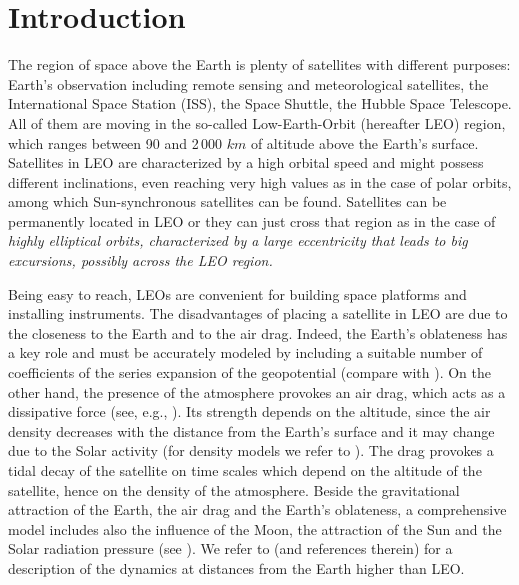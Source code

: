 \documentclass[12pt,reqno]{amsart}
\numberwithin{equation}{section}
\begin{document}

\maketitle



\section{Introduction}\label{sec:intro}
The region of space above the Earth is plenty of satellites with
different purposes: Earth's observation including remote sensing
and meteorological satellites, the International Space Station
(ISS), the Space Shuttle, the Hubble Space Telescope. All of them
are moving in the so-called Low-Earth-Orbit (hereafter LEO)
region, which ranges between 90 and 2\,000 $km$ of altitude above
the Earth's surface. Satellites in LEO are characterized by a high
orbital speed and might possess different inclinations, even
reaching very high values as in the case of polar orbits, among
which Sun-synchronous satellites can be found. Satellites can be
permanently located in LEO or they can just cross that region as in
the case of \sl highly elliptical orbits, \rm characterized by a
large eccentricity that leads to big excursions, possibly across
the LEO region.

Being easy to reach, LEOs are convenient for building space
platforms and installing instruments. The disadvantages of placing
a satellite in LEO are due to the closeness to the Earth and to
the air drag. Indeed, the Earth's oblateness has a key role and
must be accurately modeled by including a suitable number of
coefficients of the series expansion of the geopotential (compare
with \cite{FV,Liu}). On the other hand, the presence of the
atmosphere provokes an air drag, which acts as a dissipative force
(see, e.g., \cite{BV2004,Chao,Del1991,Gaias2015}). Its strength
depends on the altitude, since the air density decreases with the
distance from the Earth's surface and it may change due to the
Solar activity (for density models we refer to
\cite{Jacchia,Hedin0, Hedin,ISO}). The drag provokes a tidal decay
of the satellite on time scales which depend on the altitude of
the satellite, hence on the density of the atmosphere. Beside the
gravitational attraction of the Earth, the air drag and the
Earth's oblateness, a comprehensive model includes also the
influence of the Moon, the attraction of the Sun and the Solar
radiation pressure (see \cite{Kaula1962,CGfrontier,CGPbif,EH}). We
refer to \cite{ADRRVDQM, CGmajor, CGminor, CGexternal, CEGGP2016,
DRADVR15, Gedeon, GDGR2016, LDV, Rosengren2013, RS2, VDLC} (and
references therein) for a description of the dynamics at distances
from
the Earth higher than LEO.\\
\end{document}
